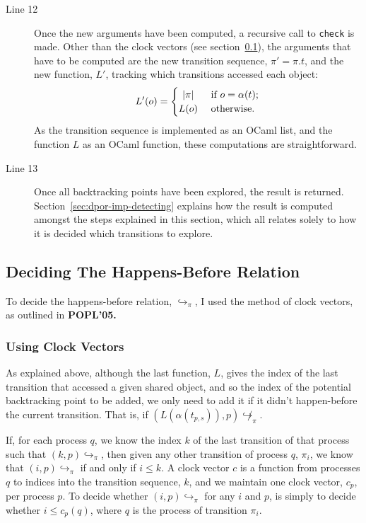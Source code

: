 \documentclass[12pt,a4paper,twoside,openright]{report}
\begin{document}
\begin{description}
	\item[Line 12] Once the new arguments have
	been computed, a recursive call to
	\texttt{check} is made. Other than
	the clock vectors (see section~\ref{sec:clock-vectors}),
	the arguments that
	have to be computed are the new transition
	sequence, $\pi' = \pi.t$,
	and the new function, $L'$,
	tracking which transitions accessed each 
	object:
	\[ L'(o) =
	\begin{cases}
		\hfill |\pi| \hfill & \text{ if } o = \alpha(t); \\
		\hfill L(o) \hfill & \text{ otherwise}.
	\end{cases}\]
	As the transition sequence is implemented as an
	OCaml list, and the function $L$ as an OCaml function,
	these computations are straightforward.

	\item[Line 13] Once all backtracking points have been
	explored, the result is returned.
	Section~\ref{sec:dpor-imp-detecting} explains how the
	result is computed amongst the steps explained in this
	section, which all relates solely to how it is
	decided which transitions to explore.

\end{description}

\subsection{Deciding The Happens-Before Relation}
\label{sec:clock-vectors}

To decide the happens-before relation,
$\hookrightarrow_\pi$, I used the method
of clock vectors, as outlined in \textbf{POPL'05.}

\subsubsection{Using Clock Vectors}

As explained above, although
the last function, $L$, gives the index
of the last transition that accessed a given shared
object, and so the index of the potential backtracking
point to be added, we only need to add it if it
didn't happen-before the current transition.
That is, if
$(L(\alpha(t_{p,s})), p)\!\not\hookrightarrow_\pi$.


If, for each process
$q$, we know the index $k$ of the last transition of that
process such that $(k, p)\!\hookrightarrow_\pi$,
then given any other transition of
process $q$, $\pi_i$, we know that
$(i, p)\!\hookrightarrow_\pi$ if and only if
$i \leq k$. A clock vector $c$ is
a function from processes $q$ to
indices into the transition sequence, $k$,
and we maintain one clock vector, $c_p$, per
process $p$. To decide whether
$(i, p)\!\hookrightarrow_\pi$ for
any $i$ and $p$, is simply to decide
whether $i \leq c_p(q)$, where $q$ is
the process of transition $\pi_i$.
\end{document}

